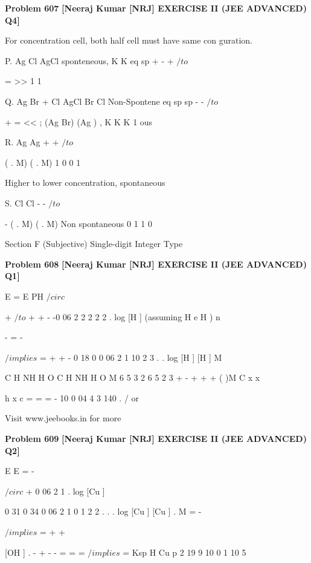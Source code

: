 \begin{problembox}
\textbf{Problem 607} \hfill \textbf{[Neeraj Kumar [NRJ] EXERCISE II (JEE ADVANCED) Q4]}
\label{q:ext-nrj_all_questions-607}

For concentration cell, both half cell must have 
same con  guration.
 
 P. Ag
Cl
AgCl sponteneous,
K
K
eq
sp
+
-
+
 $/to$
 
=
>>
1
1
 
 
 Q. Ag Br + Cl
AgCl
Br
Cl
Non-Spontene
eq
sp
sp
-
-
 $/to$
 
+
=
<<
;
(Ag Br)
(Ag
)
,
K
K
K
1
ous
 
 
 R. Ag
Ag
+
+
 $/to$
 
( . M)
( . M)
1 0
0 1
 
 
 Higher to lower concentration, spontaneous
 
 S. Cl
Cl
-
-
 $/to$
 
-
( . M)
( . M)
Non spontaneous
0 1
1 0
 
Section F (Subjective)
Single-digit Integer Type
\end{problembox}

\begin{problembox}
\textbf{Problem 608} \hfill \textbf{[Neeraj Kumar [NRJ] EXERCISE II (JEE ADVANCED) Q1]}
\label{q:ext-nrj_all_questions-608}

E = E
PH
$/circ$
 
+
$/to$
+
+
-
-0 06
2
2
2
2
2
.
log
[H ]
(assuming
H
e
H )
n
 
 
 
-
=
-
 
$/implies$
=
+
+
-
0 18
0
0 06
2
1
10
2
3
.
.
log
[H ]
[H ]
M 
 
 
C H NH
H O
C H NH
H O
M
6
5
3
2
6
5
2
3
+
-
+
+
+
(
)M
C x
x

  


 



 
 
 
h
x
c
=
=
=
-
10
0 04
4
3
140
.
/%
or
 
 
 
Visit www.jeebooks.in for more
\end{problembox}

\begin{problembox}
\textbf{Problem 609} \hfill \textbf{[Neeraj Kumar [NRJ] EXERCISE II (JEE ADVANCED) Q2]}
\label{q:ext-nrj_all_questions-609}

E
E
=
-
 
$/circ$
+
0 06
2
1
.
log
[Cu ]
 
 
 
0 31
0 34
0 06
2
1
0 1
2
2
.
.
.
log
[Cu
]
[Cu
]
. M
=
-
 
$/implies$
=
+
+
 
 
   [OH ]
.
-
+
-
-
=
=
=
$/implies$
=
Ksp
H
Cu
p
2
19
9
10
0 1
10
5
\end{problembox}


